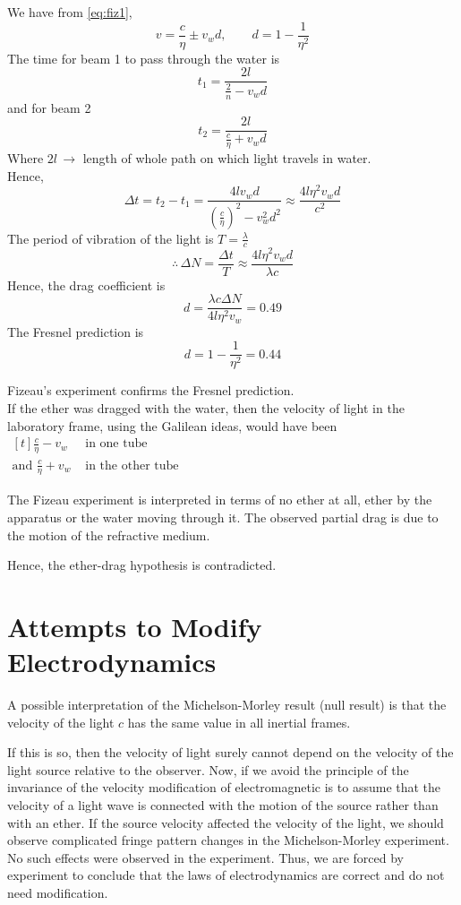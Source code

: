 \documentclass[../main-sheet.tex]{subfiles}
\begin{document}
We have from \eqref{eq:fiz1},
\[v=\frac{c }{\eta}\pm v_w d,\qquad d=1-\frac{1}{\eta^2}\]
The time for beam 1 to pass through the water is
\[t_1=\frac{2l}{\frac{2}{n }-v_w d }\]
and for beam 2
\[t_2=\frac{2l}{\frac{c}{\eta}+v_w d }\]
Where \(2l \,\to\) length of whole path on which light travels in water.\\
Hence,
\[\Delta t=t_2-t_1=\frac{4lv_w d }{\left( \frac{c }{\eta} \right)^2-v_w^2d^2}\approx \frac{4l \eta^2 v_w d }{c^2}\]
The period of vibration of the light is \(T=\frac{\lambda}{c }\)
\[\therefore \,\Delta N=\frac{\Delta t }{T }\approx \frac{4l\eta^2v_w d }{\lambda c }\]
Hence, the drag coefficient is
\[d=\frac{\lambda c \Delta N }{4l \eta^2 v_w }=0.49\]
The Fresnel prediction is
\[d=1-\frac{1}{\eta^2}=0.44\]

Fizeau's experiment confirms the Fresnel prediction.\\
If the ether was dragged with the water, then the velocity of light in the laboratory frame, using the Galilean ideas, would have been \(\begin{aligned}[t]
    \frac{c }{\eta} -v_w& \text{ in one tube}\\
    \text{and }\frac{c }{\eta} +v_w& \text{ in the other tube}
\end{aligned}\)

The Fizeau experiment is interpreted in terms of no ether at all, ether by the apparatus or the water moving through it. The observed partial drag is due to the motion of the refractive medium.

Hence, the ether-drag hypothesis is contradicted.
\section{Attempts to Modify Electrodynamics }
A possible interpretation of the Michelson-Morley result (null result) is that the velocity of the light \(c \) has the same value in all inertial frames.

If this is so, then the velocity of light surely cannot depend on the velocity of the light source relative to the observer. Now, if we avoid the principle of the invariance of the velocity modification of electromagnetic is to assume that the velocity of a light wave is connected with the motion of the source rather than with an ether. If the source velocity affected the velocity of the light, we should observe complicated fringe pattern changes in the Michelson-Morley experiment. No such effects were observed in the experiment. Thus, we are forced by experiment to conclude that the laws of electrodynamics are correct and do not need modification.
\end{document}
